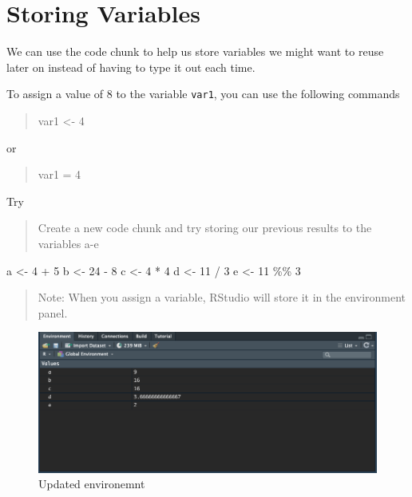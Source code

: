 \documentclass[
]{book}
\newenvironment{Shaded}{\begin{snugshade}}{\end{snugshade}}
\newcommand{\DecValTok}[1]{\textcolor[rgb]{0.00,0.00,0.81}{#1}}
\newcommand{\NormalTok}[1]{#1}
\newcommand{\OtherTok}[1]{\textcolor[rgb]{0.56,0.35,0.01}{#1}}
\newcommand{\SpecialCharTok}[1]{\textcolor[rgb]{0.00,0.00,0.00}{#1}}
\begin{document}
\hypertarget{storing-variables}{%
\section{Storing Variables}\label{storing-variables}}

We can use the code chunk to help us store variables we might want to reuse later on instead of having to type it out each time.

To assign a value of 8 to the variable \texttt{var1}, you can use the following commands

\begin{quote}
var1 \textless- 4
\end{quote}

or

\begin{quote}
var1 = 4
\end{quote}

Try

\begin{quote}
Create a new code chunk and try storing our previous results to the variables a-e
\end{quote}

\begin{Shaded}
\begin{Highlighting}[]
\NormalTok{a }\OtherTok{\textless{}{-}} \DecValTok{4} \SpecialCharTok{+} \DecValTok{5}
\NormalTok{b }\OtherTok{\textless{}{-}} \DecValTok{24} \SpecialCharTok{{-}} \DecValTok{8}
\NormalTok{c }\OtherTok{\textless{}{-}} \DecValTok{4} \SpecialCharTok{*} \DecValTok{4}
\NormalTok{d }\OtherTok{\textless{}{-}} \DecValTok{11} \SpecialCharTok{/} \DecValTok{3}
\NormalTok{e }\OtherTok{\textless{}{-}} \DecValTok{11} \SpecialCharTok{\%\%} \DecValTok{3}
\end{Highlighting}
\end{Shaded}

\begin{quote}
Note: When you assign a variable, RStudio will store it in the environment panel.
\end{quote}

\begin{figure}
\includegraphics[width=12.72in]{images/3.3variableenvironment} \caption{Updated environemnt}\label{fig:unnamed-chunk-16}
\end{figure}
\end{document}
